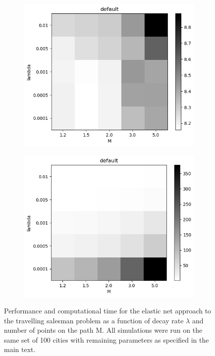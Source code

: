 \documentclass{article}
\begin{document}
\begin{figure}[h]
	\centering
	\begin{subfigure}[t]{0.35\linewidth}
		\centering
		\includegraphics[width = 1.0\linewidth, trim={8 10 7 20}, clip=true]{figures/Ls.png}
		\label{fig:Ls}	
	\end{subfigure}%
	\hspace{0.1\linewidth}
	\begin{subfigure}[t]{0.35\linewidth}
		\centering
		\includegraphics[width = 1.0\linewidth, trim={8 10 7 20}, clip=true]{figures/Ts.png}
		\label{fig:Ts}	
	\end{subfigure}%
\caption{Performance and computational time for the elastic net approach to the travelling salesman problem as a function of decay rate $\lambda$ and number of points on the path M. All simulations were run on the same set of 100 cities with remaining parameters as specified in the main text.}
\label{fig:tspopt}
\end{figure}
\end{document}
